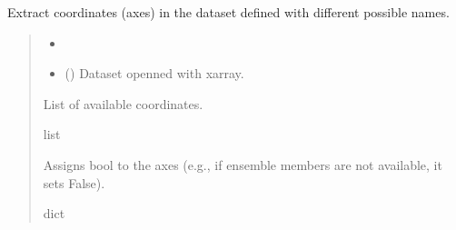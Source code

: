 \documentclass[a4paper,11pt,english]{sphinxmanual}
\begin{document}
\begin{fulllineitems}
\label{\detokenize{modules:envlib.extract_data.extract_coordinates}}
\pysigstartsignatures
{}
\pysigstopsignatures
\sphinxAtStartPar
Extract coordinates (axes) in the dataset defined with different possible names.
\begin{quote}\begin{description}
\begin{itemize}
\item {} 
\sphinxAtStartPar
{} \textendash{} 

\item {} 
\sphinxAtStartPar
{} () \textendash{} Dataset openned with xarray.

\end{itemize}

\sphinxAtStartPar
List of available coordinates.

\sphinxAtStartPar
list

\sphinxAtStartPar
Assigns bool to the axes (e.g., if ensemble members are not available, it sets False).

\sphinxAtStartPar
dict

\end{description}\end{quote}

\end{fulllineitems}

\end{document}

